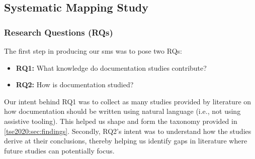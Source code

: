 \subsection{Systematic Mapping Study}
\label{tse2020:sec:method:lit-review}


\subsubsection{Research Questions (RQs)}

The first step in producing our \gls{sms} was to pose two RQs:
\begin{itemize}[leftmargin=\parindent]
  \item \textbf{RQ1:} What knowledge do  documentation studies contribute?
  \item \textbf{RQ2:} How is  documentation studied?
\end{itemize}
Our intent behind RQ1 was to collect as many studies provided by literature on how  documentation should be written using natural language (i.e., not using assistive tooling). This helped us shape and form the taxonomy provided in \cref{tse2020:sec:findings}. Secondly, RQ2's intent was to understand how the studies derive at their conclusions, thereby helping us identify gaps in literature where future studies can potentially focus.

